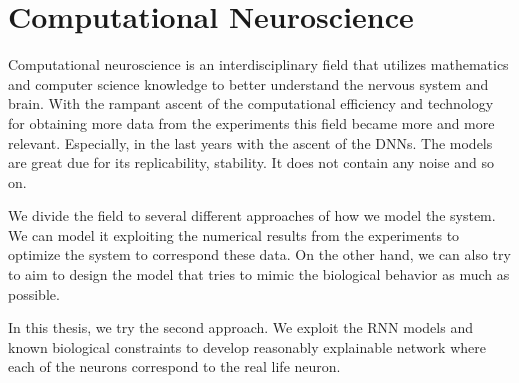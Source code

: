 \chapter{Computational Neuroscience}
\label{chap:computation_neuroscience}
Computational neuroscience is an interdisciplinary field that
utilizes mathematics and computer science knowledge to better
understand the nervous system and brain. With the rampant
ascent of the computational efficiency and technology for
obtaining more data from the experiments this field
became more and more relevant. Especially, in the last
years with the ascent of the DNNs. The models are great due for
its replicability, stability. It does not contain any noise and so on.

We divide the field to several different approaches of 
how we model the system. We can model it exploiting the numerical
results from the experiments to optimize the system to correspond 
these data. On the other hand, we can also try to aim to design
the model that tries to mimic the biological behavior as much as possible.

In this thesis, we try the second approach. We exploit the 
RNN models and known biological constraints to develop reasonably explainable
network where each of the neurons correspond to the real life neuron.